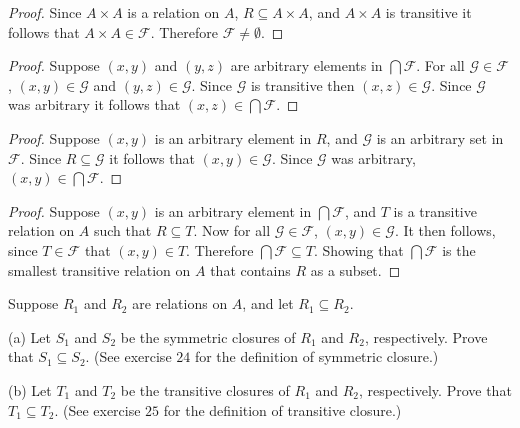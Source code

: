 \begin{proof}
    Since $A \times A$ is a relation on $A$, $R \subseteq A \times A$, and $A \times A$ is transitive
        it follows that $A \times A \in \mathcal{F}$.
    Therefore $\mathcal{F} \not = \emptyset$. 
\end{proof}

\begin{proof}
    Suppose $(x, y)$ and $(y, z)$ are arbitrary elements in $\bigcap \mathcal{F}$.
    For all $\mathcal{G} \in \mathcal{F}$, $(x, y) \in \mathcal{G}$ and $(y, z) \in \mathcal{G}$.
    Since $\mathcal{G}$ is transitive then $(x, z) \in \mathcal{G}$.
    Since $\mathcal{G}$ was arbitrary it follows that $(x, z) \in \bigcap \mathcal{F}$.
\end{proof}

\begin{proof}
    Suppose $(x, y)$ is an arbitrary element in $R$, 
        and $\mathcal{G}$ is an arbitrary set in $\mathcal{F}$.
    Since $R \subseteq \mathcal{G}$ it follows that $(x, y) \in \mathcal{G}$.
    Since $\mathcal{G}$ was arbitrary, $(x, y) \in \bigcap \mathcal{F}$.
\end{proof}

\begin{proof}
    Suppose $(x, y)$ is an arbitrary element in $\bigcap \mathcal{F}$,
        and $T$ is a transitive relation on $A$ such that $R \subseteq T$.
    Now for all $\mathcal{G} \in \mathcal{F}$, $(x, y) \in \mathcal{G}$.
    It then follows, since $T \in \mathcal{F}$ that $(x, y) \in T$.
    Therefore $\bigcap \mathcal{F} \subseteq T$.
    Showing that $\bigcap \mathcal{F}$ is the 
        smallest transitive relation on $A$ that contains $R$ 
        as a subset.
\end{proof}

\begin{tcolorbox}[title=Problem 26, breakable]
    Suppose $R_1$ and $R_2$ are relations on $A$, and let $R_1 \subseteq R_2$.

    (a) Let $S_1$ and $S_2$ be the symmetric closures of $R_1$ and $R_2$,
        respectively. Prove that $S_1 \subseteq S_2$. (See exercise $24$ for the 
        definition of symmetric closure.)

    (b) Let $T_1$ and $T_2$ be the transitive closures of $R_1$ and $R_2$, respectively.
        Prove that $T_1 \subseteq T_2$. (See exercise $25$ for the definition of transitive
        closure.)
\end{tcolorbox}

